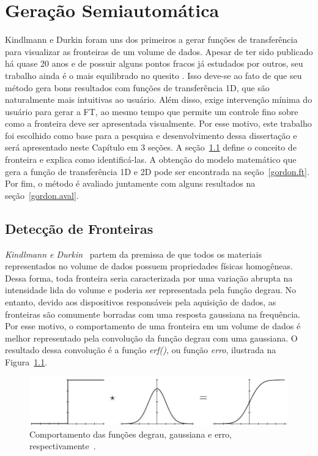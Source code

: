 
\chapter{Geração Semiautomática}
\label{gordon}

	Kindlmann e Durkin foram uns dos primeiros a gerar funções de transferência para visualizar as fronteiras de um volume de dados. Apesar de ter sido publicado há quase 20 anos e de possuir alguns pontos fracos já estudados por outros, seu trabalho ainda é o mais equilibrado no quesito . Isso deve-se ao fato de que seu método gera bons resultados com funções de transferência 1D, que são naturalmente mais intuitivas ao usuário. Além disso, exige intervenção mínima do usuário para gerar a FT, ao mesmo tempo que permite um controle fino sobre como a fronteira deve ser apresentada visualmente. Por esse motivo, este trabalho foi escolhido como base para a pesquisa e desenvolvimento dessa dissertação e será apresentado neste Capítulo em 3 seções. A seção~\ref{gordon.bound} define o conceito de fronteira e explica como identificá-las. A obtenção do modelo matemático que gera a função de transferência 1D e 2D pode ser encontrada na seção~\ref{gordon.ft}. Por fim, o método é avaliado juntamente com alguns resultados na seção~\ref{gordon.aval}.
	
\section{Detecção de Fronteiras}
\label{gordon.bound}
	\textit{Kindlmann e Durkin}~\cite{gordon} partem da premissa de que todos os materiais representados no volume de dados possuem propriedades físicas homogêneas. Dessa forma, toda fronteira seria caracterizada por uma variação abrupta na intensidade lida do volume e poderia ser representada pela função degrau. No entanto, devido aos dispositivos responsáveis pela aquisição de dados, as fronteiras são comumente borradas com uma resposta gaussiana na frequência. Por esse motivo, o comportamento de uma fronteira em um volume de dados é melhor representado pela convolução da função degrau com uma gaussiana. O resultado dessa convolução é a função \textit{erf()}, ou função \textit{erro}, ilustrada na Figura~\ref{fig:boundary_model}.
	
\begin{figure}[h]
	\centering
	\includegraphics[width=1\textwidth]{images/g_boundary_model}
	\caption{Comportamento das funções degrau, gaussiana e erro, respectivamente~\cite{gordon}.}
	\label{fig:boundary_model}
\end{figure}

